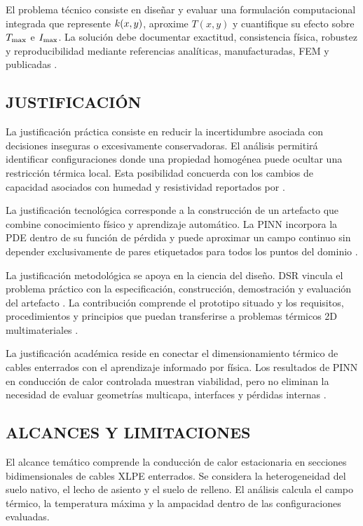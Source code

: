 El problema técnico consiste en diseñar y evaluar una formulación computacional integrada que represente $k(x,y)$, aproxime $T(x,y)$ y cuantifique su efecto sobre $T_{\max}$ e $I_{\max}$. La solución debe documentar exactitud, consistencia física, robustez y reproducibilidad mediante referencias analíticas, manufacturadas, FEM y publicadas \parencites[3--4,93--99]{cigre2025}[686--690]{raissi2019}.

\subsection{JUSTIFICACIÓN}

La justificación práctica consiste en reducir la incertidumbre asociada con decisiones inseguras o excesivamente conservadoras. El análisis permitirá identificar configuraciones donde una propiedad homogénea puede ocultar una restricción térmica local. Esta posibilidad concuerda con los cambios de capacidad asociados con humedad y resistividad reportados por \textcite[1,6--9]{khumalo2025}.

La justificación tecnológica corresponde a la construcción de un artefacto que combine conocimiento físico y aprendizaje automático. La PINN incorpora la PDE dentro de su función de pérdida y puede aproximar un campo continuo sin depender exclusivamente de pares etiquetados para todos los puntos del dominio \parencites[686--690]{raissi2019}[1--3,12]{aldulaimi2024}.

La justificación metodológica se apoya en la ciencia del diseño. DSR vincula el problema práctico con la especificación, construcción, demostración y evaluación del artefacto \parencite[55--56]{peffers2007}. La contribución comprende el prototipo situado y los requisitos, procedimientos y principios que puedan transferirse a problemas térmicos 2D multimateriales \parencite[342--350]{gregor2013}.

La justificación académica reside en conectar el dimensionamiento térmico de cables enterrados con el aprendizaje informado por física. Los resultados de PINN en conducción de calor controlada muestran viabilidad, pero no eliminan la necesidad de evaluar geometrías multicapa, interfaces y pérdidas internas \parencites[1--3,17]{xing2023}[1,3,16]{pan2025}[2--6]{ren2025}.

\subsection{ALCANCES Y LIMITACIONES}

El alcance temático comprende la conducción de calor estacionaria en secciones bidimensionales de cables XLPE enterrados. Se considera la heterogeneidad del suelo nativo, el lecho de asiento y el suelo de relleno. El análisis calcula el campo térmico, la temperatura máxima y la ampacidad dentro de las configuraciones evaluadas.

